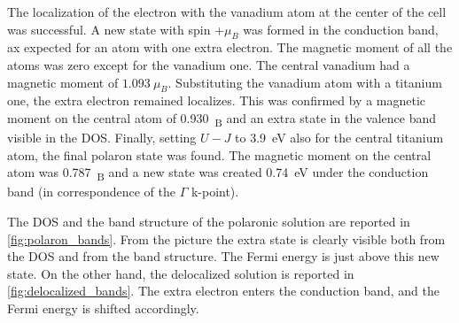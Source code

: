 The localization of the electron with the vanadium atom at the center of the cell was successful. A new state with spin +$\mu_B$ was formed in the conduction band, ax expected for an atom with one extra electron. The magnetic moment of all the atoms was zero except for the vanadium one. The central vanadium had a magnetic moment of $\SI{1.093}{\mu_B}$. Substituting the vanadium atom with a titanium one, the extra electron remained localizes. This was confirmed by a magnetic moment on the central atom of \SI{0.930}{\mu_B} and an extra state in the valence band visible in the DOS. Finally, setting $U-J$ to \SI{3.9}{eV} also for the central titanium atom, the final polaron state was found. The magnetic moment on the central atom was \SI{0.787}{\mu_B} and a new state was created \SI{0.74}{eV} under the conduction band (in correspondence of the $\Gamma$ k-point).

The DOS and the band structure of the polaronic solution are reported in \cref{fig:polaron_bands}. From the picture the extra state is clearly visible both from the DOS and from the band structure. The Fermi energy is just above this new state. On the other hand, the delocalized solution is reported in \cref{fig:delocalized_bands}. The extra electron enters the conduction band, and the Fermi energy is shifted accordingly.

